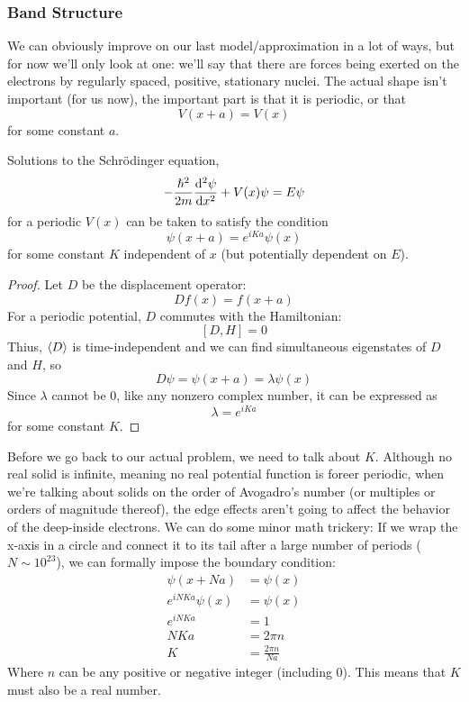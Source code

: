 \documentclass[a4paper]{article}
\begin{document}
\subsubsection{Band Structure}
We can obviously improve on our last model/approximation in a lot of ways, but
for now we'll only look at one: we'll say that there are forces being exerted
on the electrons by regularly spaced, positive, stationary nuclei. The
actual shape isn't important (for us now), the important part is that it
is periodic, or that
\[ V(x+a) = V(x) \]
for some constant $a$.
\begin{thm}
	Solutions to the Schr\"odinger equation,
	\[ -\frac{\hslash^2}{2m}\frac{\mathrm{d} ^2\psi}{\mathrm{d} x^2} + V(x)\psi = E\psi \]
	for a periodic $V(x)$ can be taken to satisfy the condition
	\[ \psi(x+a) = e^{iKa}\psi(x) \]
	for some constant $K$ independent of $x$ (but potentially dependent on
	$E$).
\end{thm}
\begin{proof}
	Let $D$ be the displacement operator:
	\[ D f(x) = f(x+a) \]
	For a periodic potential, $D$ commutes with the Hamiltonian:
	\[ [D,H] = 0 \]
	Thius, $\left\langle D\right\rangle$ is time-independent and we can find simultaneous
	eigenstates of $D$ and $H$, so
	\[ D\psi = \psi(x+a) = \lambda\psi(x) \]
	Since $\lambda$ cannot be 0, like any nonzero complex number, it can
	be expressed as
	\[ \lambda = e^{iKa} \]
	for some constant $K$.
\end{proof}
Before we go back to our actual problem, we need to talk about $K$. Although
no real solid is infinite, meaning no real potential function is foreer
periodic, when we're talking about solids on the order of Avogadro's number
(or multiples or orders of magnitude thereof), the edge effects aren't going
to affect the behavior of the deep-inside electrons. We can do some
minor math trickery: If we wrap the x-axis in a circle and connect it to its
tail after a large number of periods ($N\sim10^{23}$), we can formally impose
the boundary condition:
\begin{align*}
	\psi(x+Na) &= \psi(x)\\
	e^{iNKa}\psi(x) &= \psi(x)\\
	e^{iNKa} &= 1\\
	NKa &= 2\pi n\\
	K &= \frac{2\pi n}{Na}
\end{align*}
Where $n$ can be any positive or negative integer (including 0). This means
that $K$ must also be a real number.
\end{document}
